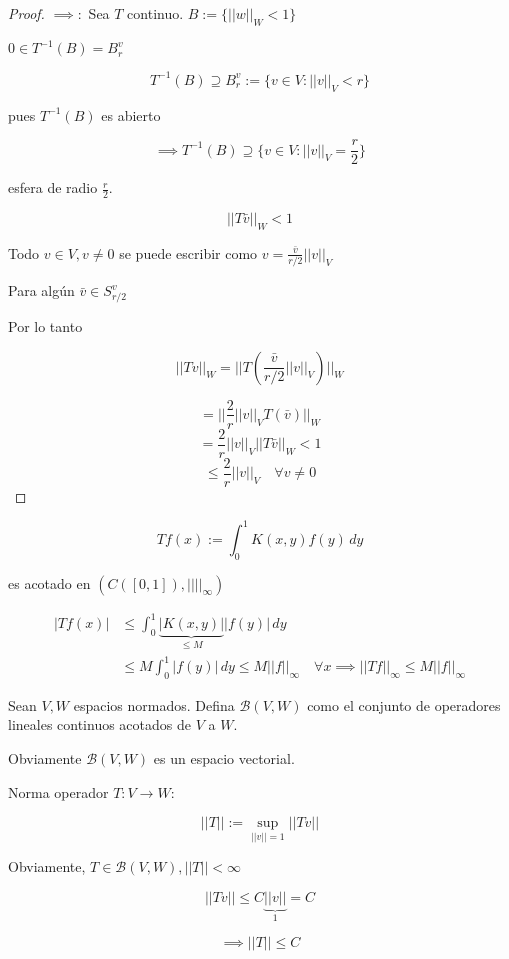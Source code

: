 \documentclass[../Apunte.tex]{subfiles}
\begin{document}
\begin{proof}
    $\implies:$ Sea $T$ continuo. $B:=\{||w||_W<1\}$

    $0\in T^{-1}(B)=B_r^v$

    \[T^{-1}(B)\supseteq B_r^v:=\{v\in V:||v||_V<r\}\]

    pues $T^{-1}(B)$ es abierto 

    \[\implies T^{-1}(B)\supseteq \{v\in V:||v||_V=\frac{r}{2}\}\]

    esfera de radio $\frac{r}{2}$.

    \[||T\bar v||_W<1\]

    Todo $v\in V,v\neq 0$ se puede escribir como $v=\frac{\bar v}{r/2}||v||_V$

    Para algún $\bar v\in S_{r/2}^v$

    Por lo tanto

    \[||Tv||_W=||T(\frac{\bar v }{r/2}||v||_V)||_W\]

    \[=||\frac{2}{r}||v||_V T(\bar v)||_W\]
    \[=\frac{2}{r}||v||_V ||T\bar v||_W<1\]
    \[\leq \frac{2}{r}||v||_V\quad \forall v\neq 0\]
\end{proof}

\begin{fexample}
    \[Tf(x):=\int_0^1 K(x,y)f(y)\,dy\]

    es acotado en $(C([0,1]),||||_\infty )$

    \begin{align*}|Tf(x)|&\leq \int_0^1 \underbrace{|K(x,y)|}_{\leq M}|f(y)|\,dy\\
    &\leq M\int_0^1 |f(y)|\,dy\leq M ||f||_\infty\quad \forall x\implies ||Tf||_\infty \leq M||f||_\infty\end{align*}
\end{fexample}

\begin{fdefinition}
    Sean $V,W$ espacios normados. Defina $\mathcal{B}(V,W)$ como el conjunto de operadores lineales continuos acotados de $V$ a $W$.

    Obviamente $\mathcal{B}(V,W)$ es un espacio vectorial.
\end{fdefinition}

Norma operador $T:V\to W$:

\[||T||:=\sup_{||v||=1} ||Tv||\]

Obviamente, $T\in \mathcal{B}(V,W), ||T||<\infty$

\[||Tv||\leq C \underbrace{||v||}_1=C\]

\[\implies ||T||\leq C\]
\end{document}
